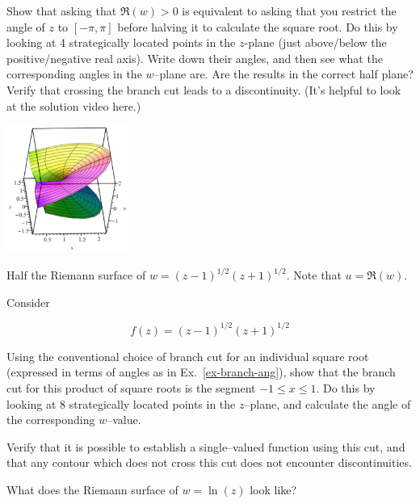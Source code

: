 \begin{exer}
\label{ex-branch-ang}
Show that asking that $\Re(w)>0$ is equivalent to asking that you restrict the angle of $z$ to $[-\pi, \pi]$ before halving it to calculate the square root. Do this by looking at 4 strategically located points in the $z$-plane (just above/below the positive/negative real axis). Write down their angles, and then see what the corresponding angles in the $w$--plane are. Are the results in the correct half plane? Verify that crossing the branch cut leads to a discontinuity. (It's helpful to look at the solution video here.)
\end{exer}

\begin{exer}
\label{ex-product-roots}
\begin{marginfigure}[0.5cm]
\centering
\includegraphics[width=4cm]{complex/figures/riemann2}
\caption{Half the Riemann surface of $w=(z-1)^{1/2}(z+1)^{1/2}$. Note that $u=\Re(w)$. }
\label{fig-riemann2}
\end{marginfigure}
Consider

$$f(z)=(z-1)^{1/2}(z+1)^{1/2}$$

Using the conventional choice of branch cut for an individual square root (expressed in terms of angles as in Ex.~\ref{ex-branch-ang}), show that the branch cut for this product of square roots is the segment $-1 \le x \le 1$. Do this by looking at 8 strategically located points in the $z$--plane, and calculate the angle of the corresponding $w$--value.


Verify that it is possible to establish a single--valued function using this cut, and that any contour which does not cross this cut does not encounter discontinuities.
\end{exer}

\begin{exer}
What does the Riemann surface of $w=\ln(z)$ look like?
\end{exer}

